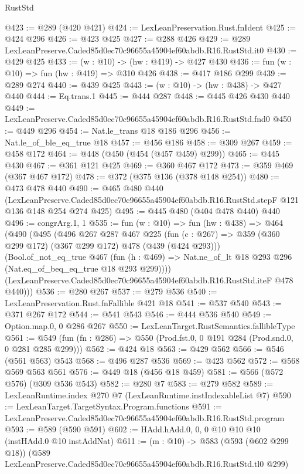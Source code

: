 \begin{lexlean}{RustStd}
\begin{coremodule}
@423 := @289 (@420 @421)
@424 := LexLeanPreservation.Rust.fnIdent
@425 := @424 @296
@426 := @423 @425
@427 := @288 @426
@429 := @289 LexLeanPreserve.Caded85d0ec70c96655a45904ef60abdb.R16.RustStd.it0
@430 := @429 @425
@433 := (w : @10) -> (hw : @419) -> @427 @430
@436 := fun (w : @10) => fun (hw : @419) => @310 @426
@438 := @417 @186 @299
@439 := @289 @274
@440 := @439 @425
@443 := (w : @10) -> (hw : @438) -> @427 @440
@444 := Eq.trans.{1}
@445 := @444 @287
@448 := @445 @426 @430 @440
@449 := LexLeanPreserve.Caded85d0ec70c96655a45904ef60abdb.R16.RustStd.fnd0
@450 := @449 @296
@454 := Nat.le_trans @18 @186 @296
@456 := Nat.le_of_ble_eq_true @18
@457 := @456 @186
@458 := @309 @267
@459 := @458 @172
@464 := @448 (@450 (@454 (@457 @459) @299))
@465 := @445 @430
@467 := @361 @121 @425
@469 := @360 @467 @172
@473 := @359 @469 (@367 @467 @172)
@478 := @372 (@375 @136 (@378 @148 @254))
@480 := @473 @478 @440
@490 := @465
    @480
    @440
    (LexLeanPreserve.Caded85d0ec70c96655a45904ef60abdb.R16.RustStd.stepF
      @121
      @136
      @148
      @254
      @274
      @425)
@495 := @445 @480 (@404 @478 @440) @440
@496 := congrArg.{1, 1}
@535 := fun (w : @10) =>
  fun (hw : @438) =>
  @464
    (@490
      (@495
        (@496
          @267
          @287
          @467
          @225
          (fun (c : @267) => @359 (@360 @299 @172) (@367 @299 @172) @478 (@439 (@424 @293)))
          (Bool.of_not_eq_true
            @467
            (fun (h : @469) => Nat.ne_of_lt @18 @293 @296 (Nat.eq_of_beq_eq_true @18 @293 @299))))
        (LexLeanPreserve.Caded85d0ec70c96655a45904ef60abdb.R16.RustStd.iteF @478 @440)))
@536 := @280 @267
@537 := @279 @536
@540 := LexLeanPreservation.Rust.fnFallible @421 @18
@541 := @537 @540
@543 := @371 @267 @172
@544 := @541 @543
@546 := @444 @536 @540
@549 := Option.map.{0, 0} @286 @267
@550 := LexLeanTarget.RustSemantics.fallibleType
@561 := @549 (fun (fn : @286) => @550 (Prod.fst.{0, 0} @191 @284 (Prod.snd.{0, 0} @281 @285 @299)))
@562 := @424 @18
@563 := @429 @562
@566 := @546 (@561 @563) @543
@568 := @496 @287 @536
@569 := @423 @562
@572 := @568 @569 @563 @561
@576 := @449 @18 (@456 @18 @459)
@581 := @566 (@572 @576) (@309 @536 @543)
@582 := @280 @7
@583 := @279 @582
@589 := LexLeanRuntime.index @270 @7 (LexLeanRuntime.instIndexableList @7)
@590 := LexLeanTarget.TargetSyntax.Program.functions
@591 := LexLeanPreserve.Caded85d0ec70c96655a45904ef60abdb.R16.RustStd.program
@593 := @589 (@590 @591)
@602 := HAdd.hAdd.{0, 0, 0} @10 @10 @10 (instHAdd.{0} @10 instAddNat)
@611 := (m : @10) ->
  @583
    (@593 (@602 @299 @18))
    (@589 LexLeanPreserve.Caded85d0ec70c96655a45904ef60abdb.R16.RustStd.tl0 @299)

\end{coremodule}
\end{lexlean}
